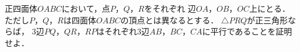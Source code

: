 \documentclass[../../main.tex]{subfiles}
\begin{document}
正四面体$OABC$において，点$P$，$Q$，$R$をそれぞれ
辺$OA$，$OB$，$OC$上にとる．
ただし$P$，$Q$，$R$は四面体$OABC$の頂点とは異なるとする．
$\triangle PRQ$が正三角形ならば，
3辺$PQ$，$QR$，$RP$はそれぞれ3辺$AB$，$BC$，$CA$に平行であることを証明せよ．
\end{document}
